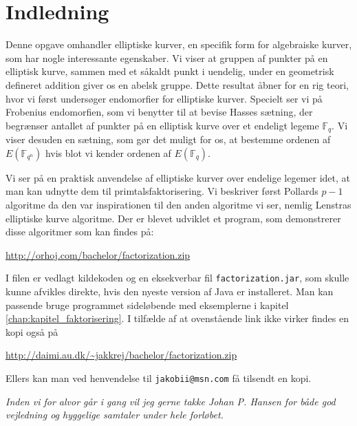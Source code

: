\chapter{Indledning}

Denne opgave omhandler elliptiske kurver, en specifik form for algebraiske kurver, som har nogle interessante egenskaber. Vi viser at gruppen af punkter på en elliptisk kurve, sammen med et såkaldt punkt i uendelig, under en geometrisk defineret addition giver os en abelsk gruppe. Dette resultat åbner for en rig teori, hvor vi først undersøger endomorfier for elliptiske kurver. Specielt ser vi på Frobenius endomorfien, som vi benytter til at bevise Hasses sætning, der begrænser antallet af punkter på en elliptisk kurve over et endeligt legeme $\mathbb{F}_q$. Vi viser desuden en sætning, som gør det muligt for os, at bestemme ordenen af $E(\mathbb{F}_{q^n})$ hvis blot vi kender ordenen af $E(\mathbb{F}_q)$.

Vi ser på en praktisk anvendelse af elliptiske kurver over endelige legemer idet, at man kan udnytte dem til primtalsfaktorisering. Vi beskriver først Pollards $p-1$ algoritme da den var inspirationen til den anden algoritme vi ser, nemlig Lenstras elliptiske kurve algoritme. 
Der er blevet udviklet et program, som demonstrerer disse algoritmer som kan findes på:
\begin{center}
	\url{http://orhoj.com/bachelor/factorization.zip}
\end{center}
I filen er vedlagt kildekoden og en eksekverbar fil \texttt{factorization.jar}, som skulle kunne afvikles direkte, hvis den nyeste version af Java er installeret. Man kan passende bruge programmet sideløbende med eksemplerne i kapitel \ref{chap:kapitel_faktorisering}. I tilfælde af at ovenstående link ikke virker findes en kopi også på
\begin{center}
	\url{http://daimi.au.dk/~jakkrej/bachelor/factorization.zip}
\end{center}
Ellers kan man ved henvendelse til \texttt{jakobii@msn.com} få tilsendt en kopi.

\vspace*{\fill}
\textit{Inden vi for alvor går i gang vil jeg gerne takke Johan P. Hansen for både god vejledning og hyggelige samtaler under hele forløbet.}